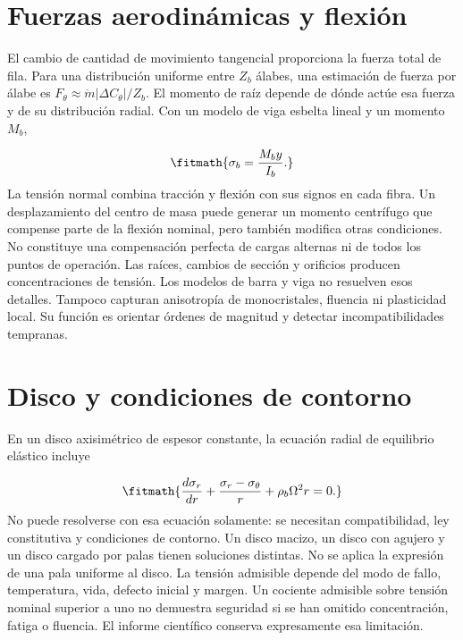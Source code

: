 \documentclass[10pt,openany]{book}
\begin{document}
\begin{minipage}{\linewidth}
\begin{tikzpicture}
\end{tikzpicture}%
\fi
\fi
\endgroup
\par\nopagebreak
{}
\end{minipage}
\par\vspace{\baselineskip}

\section{Fuerzas aerodinámicas y flexión}

El cambio de cantidad de movimiento tangencial proporciona la fuerza total de fila. Para una distribución uniforme entre \(Z_b\) álabes, una estimación de fuerza por álabe es \(F_\theta\approx\dot m|\Delta C_\theta|/Z_b\). El momento de raíz depende de dónde actúe esa fuerza y de su distribución radial.
Con un modelo de viga esbelta lineal y un momento \(M_b\),

\[
\fitmath{\sigma_b=\frac{M_b y}{I_b}.}
\]
La tensión normal combina tracción y flexión con sus signos en cada fibra. Un desplazamiento del centro de masa puede generar un momento centrífugo que compense parte de la flexión nominal, pero también modifica otras condiciones. No constituye una compensación perfecta de cargas alternas ni de todos los puntos de operación.
Las raíces, cambios de sección y orificios producen concentraciones de tensión. Los modelos de barra y viga no resuelven esos detalles. Tampoco capturan anisotropía de monocristales, fluencia ni plasticidad local. Su función es orientar órdenes de magnitud y detectar incompatibilidades tempranas.

\section{Disco y condiciones de contorno}

En un disco axisimétrico de espesor constante, la ecuación radial de equilibrio elástico incluye

\[
\fitmath{\frac{d\sigma_r}{dr}+\frac{\sigma_r-\sigma_\theta}{r}+\rho_b\Omega^2r=0.}
\]
No puede resolverse con esa ecuación solamente: se necesitan compatibilidad, ley constitutiva y condiciones de contorno. Un disco macizo, un disco con agujero y un disco cargado por palas tienen soluciones distintas. No se aplica la expresión de una pala uniforme al disco.
La tensión admisible depende del modo de fallo, temperatura, vida, defecto inicial y margen. Un cociente admisible sobre tensión nominal superior a uno no demuestra seguridad si se han omitido concentración, fatiga o fluencia. El informe científico conserva expresamente esa limitación.
\end{document}
